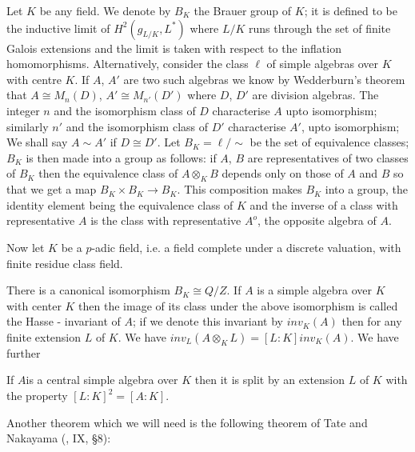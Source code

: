 Let $K$ be any field. We denote by $B_K$ the Brauer
group of $K$; it 
is defined to be the inductive limit of $H^2(g_{L/K}, L^*)$ where $L/K$
runs through the set of finite Galois extensions and the limit is
taken with respect to the inflation homomorphisms. Alternatively,
consider the class $\ell$ of simple algebras over $K$ with centre
$K$. If $A$, $A'$ are two such algebras we know by Wedderburn's theorem
that $A \cong M_n (D)$, $A' \cong M_{n'} (D')$ where $D$, $D'$ are division
algebras. The integer $n$ and the isomorphism class of $D$
characterise $A$ upto isomorphism; similarly $n'$ and the isomorphism
class of $D'$ characterise $A'$, upto isomorphism; We shall say $A
\sim A'$ if $D \cong D'$. Let $B_K = \ell / \sim$ be the set of
equivalence classes; $B_K$ is then made into a group as follows: if
$A$, $B$ are representatives of two classes of $B_K$ then the
equivalence class of $A \otimes_K B$ depends only on those of $A$ and
$B$ so that we get a map $B_K \times B_K \rightarrow B_K$. This
composition makes $B_K$ into a group, the identity element being the
equivalence class of $K$ and the inverse of a class with
representative $A$ is the class with representative $A^o$, the
opposite algebra of $A$. 

Now let $K$ be a $p$-adic field, i.e. a field complete under a discrete
valuation, with finite residue class field. 

\begin{thm}\label{chap3:thm2}
 There is a canonical isomorphism $B_K \cong Q/Z$. If
    $A$ is a simple algebra over $K$ with center $K$ then the image of
    its class under the above isomorphism is called the Hasse -
    invariant of $A$; if we denote this invariant by $inv_K (A)$ then
    for any finite extension $L$ of $K$. We have $inv_L (A \otimes_K
    L) = [ L : K] inv_K(A)$. We have further 
 \end{thm} 

 \begin{thm}\label{chap3:thm3}
If $A$\pageoriginale is a central simple algebra over $K$ then it is
split by an extension $L$ of $K$ with the property $[L : K]^2 = [ A:K ]$. 
 
 Another theorem which we will need is the following theorem of Tate
 and Nakayama (\cite{keyS1},  IX, \S 8): 
 \end{thm}

